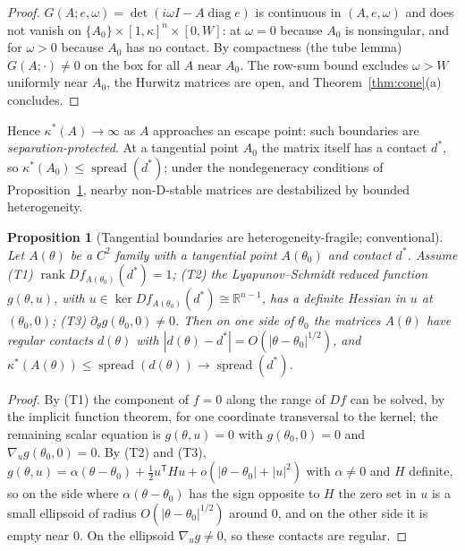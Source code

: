\documentclass[11pt,a4paper]{article}
\theoremstyle{plain}
\newtheorem{proposition}[theorem]{Proposition}
\theoremstyle{definition}
\newcommand{\R}{\mathbb{R}}
\newcommand{\diag}{\operatorname{diag}}
\newcommand{\spread}{\operatorname{spread}}
\newcommand{\ks}{\kappa^{*}}
\begin{document}
\begin{proof}
$G(A;e,\omega)=\det(i\omega I-A\diag e)$ is continuous in $(A,e,\omega)$ and does not vanish on
$\{A_0\}\times[1,\kappa]^n\times[0,W]$: at $\omega=0$ because $A_0$ is nonsingular, and for $\omega>0$ because
$A_0$ has no contact. By compactness (the tube lemma) $G(A;\cdot)\neq0$ on the box for all $A$ near $A_0$.
The row-sum bound excludes $\omega>W$ uniformly near $A_0$, the Hurwitz matrices are open, and
Theorem~\ref{thm:cone}(a) concludes.
\end{proof}

Hence $\ks(A)\to\infty$ as $A$ approaches an escape point: such boundaries are \emph{separation-protected}. At a
tangential point $A_0$ the matrix itself has a contact $d^{*}$, so $\ks(A_0)\le\spread(d^{*})$; under the
nondegeneracy conditions of Proposition~\ref{prop:fragile}, nearby non-D-stable matrices are destabilized by
bounded heterogeneity.

\begin{proposition}[Tangential boundaries are heterogeneity-fragile; conventional]\label{prop:fragile}
Let $A(\theta)$ be a $C^2$ family with a tangential point $A(\theta_0)$ and contact $d^{*}$. Assume (T1)
$\operatorname{rank}Df_{A(\theta_0)}(d^{*})=1$; (T2) the Lyapunov--Schmidt reduced function $g(\theta,u)$, with
$u\in\ker Df_{A(\theta_0)}(d^{*})\cong\R^{n-1}$, has a definite Hessian in $u$ at $(\theta_0,0)$; (T3)
$\partial_\theta g(\theta_0,0)\neq0$. Then on one side of $\theta_0$ the matrices $A(\theta)$ have regular contacts
$d(\theta)$ with $|d(\theta)-d^{*}|=O(|\theta-\theta_0|^{1/2})$, and $\ks(A(\theta))\le\spread(d(\theta))\to\spread(d^{*})$.
\end{proposition}

\begin{proof}
By (T1) the component of $f=0$ along the range of $Df$ can be solved, by the implicit function theorem, for one
coordinate transversal to the kernel; the remaining scalar equation is $g(\theta,u)=0$ with $g(\theta_0,0)=0$ and
$\nabla_ug(\theta_0,0)=0$. By (T2) and (T3),
$g(\theta,u)=\alpha(\theta-\theta_0)+\tfrac12u^{\mathsf T}Hu+o(|\theta-\theta_0|+|u|^2)$ with $\alpha\neq0$ and $H$
definite, so on the side where $\alpha(\theta-\theta_0)$ has the sign opposite to $H$ the zero set in $u$ is a small
ellipsoid of radius $O(|\theta-\theta_0|^{1/2})$ around $0$, and on the other side it is empty near $0$. On the
ellipsoid $\nabla_ug\neq0$, so these contacts are regular.
\end{proof}
\end{document}
